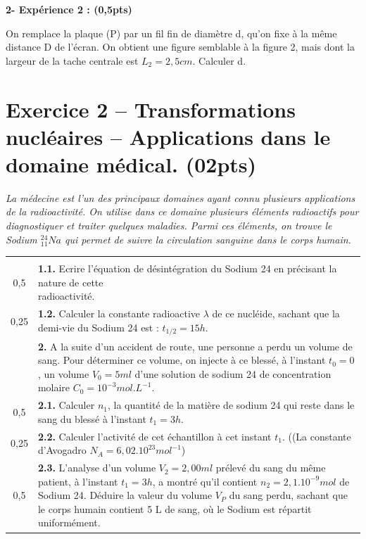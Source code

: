 \documentclass[12pt]{article}
\begin{document}
\hspace{-1cm}\textbf{2- Expérience 2 :  \dotfill(0,5pts)}

	On remplace la plaque (P) par un fil fin
de diamètre d, qu’on fixe à la même
distance D de l’écran. On obtient une
figure semblable à la figure 2, mais dont
la largeur de la tache centrale est
$L_2 = 2,5 cm$. Calculer d.


\section*{Exercice 2 – Transformations nucléaires – Applications dans le domaine médical. \dotfill(02pts)}
\emph{La médecine est l'un des principaux domaines ayant connu plusieurs applications de
la radioactivité. On utilise dans ce domaine plusieurs éléments radioactifs pour
diagnostiquer et traiter quelques maladies. Parmi ces éléments, on trouve le Sodium
$^{24}_{11}Na$ qui permet de suivre la circulation sanguine dans le corps humain.}

\begin{tabular}{c|l}	

	  & \makecell[l]{\textbf{1. }Le nucléide Sodium $^{24}_{11}Na$ se désintègre en Magnésium $^{24}_{12}Mg$ .}\\
	0,5 & \makecell[l]{\textbf{1.1. }Ecrire l’équation de désintégration du Sodium 24 en précisant la nature de
cette \\radioactivité.  }\\
	0,25 & \makecell[l]{\textbf{1.2. }Calculer la constante radioactive $\lambda$ de ce nucléide, sachant que\\ la demi-vie
	du Sodium 24 est : $t_{1/2} = 15 h.$ }\\
	
	 & \makecell[l]{\textbf{2. } A la suite d’un accident de route, une personne a perdu un volume de sang.
Pour \\déterminer ce volume, on injecte à ce blessé, à l’instant $t_0 = 0$, un volume
$V_0 = 5 ml$ d’une \\solution de sodium 24 de concentration molaire
$C_0 = 10^{-3} mol.L^{-1}$. }\\
	0,5 & \makecell[l]{\textbf{2.1. }Calculer $n_1$, la quantité de la matière de sodium 24 qui reste dans le sang du
blessé \\à l’instant $t_1 = 3h$. }\\

		0,25 & \makecell[l]{\textbf{2.2. }Calculer l’activité de cet échantillon à cet instant $t_1$. \\((La constante d’Avogadro $N_A = 6,02.10^{23} mol^{-1}$) }\\
	0,5 & \makecell[l]{\textbf{2.3. }L’analyse d’un volume $V_2 = 2,00 ml$ prélevé du sang du même patient, à
		l’instant $t_1 = 3 h$,\\ a montré qu’il contient $n_2 = 2,1.10^{-9} mol$ de Sodium 24.
Déduire la valeur du volume $V_P$ du \\sang perdu, sachant que le corps
humain contient 5 L de sang, où le Sodium est \\répartit uniformément. }\\
\end{tabular}
\end{document}
